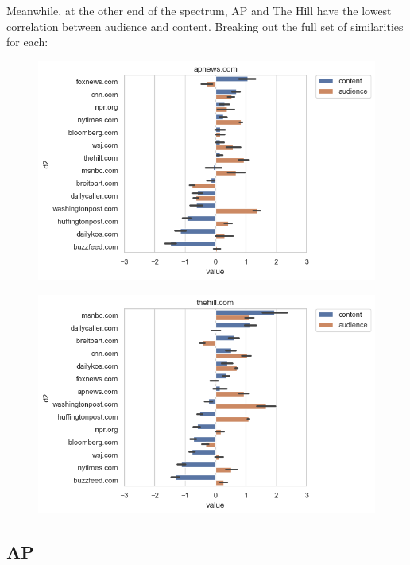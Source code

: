 \documentclass{scrartcl}
\begin{document}
Meanwhile, at the other end of the spectrum, AP and The Hill have the lowest correlation between audience and content. Breaking out the full set of similarities for each:

\begin{figure}[H]
  \centering
  \includegraphics[width=\textwidth]{figures/ca-apnews-composite.png}
\end{figure}

\begin{figure}[H]
  \centering
  \includegraphics[width=\textwidth]{figures/ca-thehill-composite.png}
\end{figure}

\subsection{AP}
\end{document}
